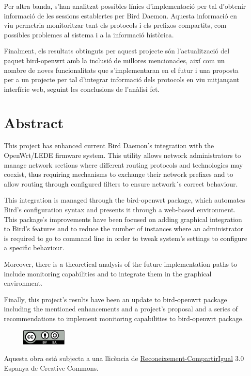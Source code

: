 Per altra banda, s'han analitzat possibles l\'{i}nies d'implementació per tal d'obtenir informació de les sessions establertes per Bird Daemon. Aquesta informaci\'{o} en viu permetria monitoritzar tant els protocols i els prefixos compartits, com possibles problemes al sistema i a la informaci\'{o} hist\`{o}rica.

Finalment, els resultats obtinguts per aquest projecte són l'actualització del paquet bird-openwrt amb la inclusi\'{o} de millores mencionades, aix\'{i} com un nombre de noves funcionalitats que s'implementaran en el futur i una proposta per a un projecte per tal d'integrar informació dels protocols en viu mitjançant interf\'{i}cie web, seguint les conclusions de l'an\`{a}lisi fet.
\newpage

\section*{Abstract}
\thispagestyle{empty}
This project has enhanced current Bird Daemon's integration with the OpenWrt/LEDE firmware system. This utility allows network administrators to manage network sections where different routing protocols and technologies may coexist, thus requiring mechanisms to exchange their network prefixes and to allow routing through configured filters to ensure network´s correct behaviour.

This integration is managed through the bird-openwrt package, which automates Bird's configuration syntax and presents it through a web-based environment. This package's improvements have been focused on adding graphical integration to Bird's features and to reduce the number of instances where an administrator is required to go to command line in order to tweak system's settings to configure a specific behaviour.

Moreover, there is a theoretical analysis of the future implementation paths to include monitoring capabilities and to integrate them in the graphical environment. 

Finally, this project's results have been an update to bird-openwrt package including the mentioned enhancements and a project's proposal and a series of recommendations to implement monitoring capabilities to bird-openwrt package.

\newpage
\thispagestyle{empty}
\par\vspace*{\fill}
\begin{figure}[ht!]
    \centering
    \includegraphics[width=0.2\textwidth]{images/CC/ccbysa}
\end{figure}
\noindent
Aquesta obra est\`{a} subjecta a una llic\`{e}ncia de \href{https://creativecommons.org/licenses/by-sa/3.0/es/legalcode.ca}{Reconeixement-CompartirIgual} 3.0 Espanya de Creative Commons.

